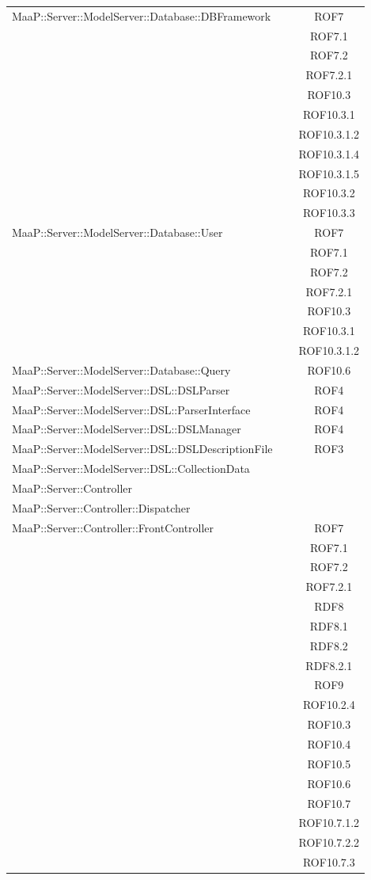 \begin{center}
\begin{longtable}{|p{0.8\linewidth}|c|}
\midrule 
MaaP::Server::ModelServer::Database::DBFramework
& ROF7\\
& ROF7.1\\
& ROF7.2\\
& ROF7.2.1\\
& ROF10.3\\
& ROF10.3.1\\
& ROF10.3.1.2\\
& ROF10.3.1.4\\
& ROF10.3.1.5\\
& ROF10.3.2\\
& ROF10.3.3\\


\midrule 
MaaP::Server::ModelServer::Database::User
& ROF7\\
& ROF7.1\\
& ROF7.2\\
& ROF7.2.1\\
& ROF10.3\\
& ROF10.3.1\\
& ROF10.3.1.2\\

\midrule 
MaaP::Server::ModelServer::Database::Query
& ROF10.6\\

\midrule 
MaaP::Server::ModelServer::DSL::DSLParser
& ROF4\\

\midrule 
MaaP::Server::ModelServer::DSL::ParserInterface
& ROF4\\

\midrule 
MaaP::Server::ModelServer::DSL::DSLManager
& ROF4\\

\midrule 
MaaP::Server::ModelServer::DSL::DSLDescriptionFile
& ROF3\\

\midrule 
MaaP::Server::ModelServer::DSL::CollectionData
& \\

\midrule 
MaaP::Server::Controller 
& \\

\midrule 
MaaP::Server::Controller::Dispatcher
& \\

\midrule 
MaaP::Server::Controller::FrontController
& ROF7\\
& ROF7.1\\
& ROF7.2\\
& ROF7.2.1\\
& RDF8\\
& RDF8.1\\
& RDF8.2\\
& RDF8.2.1\\
& ROF9\\
& ROF10.2.4\\
& ROF10.3\\
& ROF10.4\\
& ROF10.5\\
& ROF10.6\\
& ROF10.7\\
& ROF10.7.1.2\\
& ROF10.7.2.2\\
& ROF10.7.3\\


\end{longtable}
\end{center}
